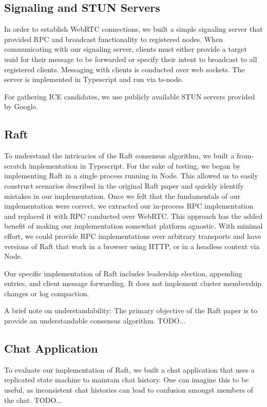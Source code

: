 \documentclass[11pt,twocolumn]{article}
\begin{document}
\subsection{Signaling and STUN Servers}
In order to establish WebRTC connections, we built a simple signaling server that provided RPC and broadcast functionality to registered nodes. When communicating with our signaling server, clients must either provide a target uuid for their message to be forwarded or specify their intent to broadcast to all registered clients. Messaging with clients is conducted over web sockets. The server is implemented in Typescript and run via ts-node.

For gathering ICE candidates, we use publicly available STUN servers provided by Google.

\subsection{Raft}
To understand the intricacies of the Raft consensus algorithm, we built a from-scratch implementation in Typescript. For the sake of testing, we began by implementing Raft in a single process running in Node. This allowed us to easily construct scenarios described in the original Raft paper and quickly identify mistakes in our implementation. Once we felt that the fundamentals of our implementation were correct, we extracted our in-process RPC implementation and replaced it with RPC conducted over WebRTC. This approach has the added benefit of making our implementation somewhat platform agnostic. With minimal effort, we could provide RPC implementations over arbitrary transports and have versions of Raft that work in a browser using HTTP, or in a headless context via Node.

Our specific implementation of Raft includes leadership election, appending entries, and client message forwarding. It does not implement cluster membership changes or log compaction.

A brief note on understandability: The primary objective of the Raft paper is to provide an understandable consensus algorithm. TODO...

\subsection{Chat Application}
To evaluate our implementation of Raft, we built a chat application that uses a replicated state machine to maintain chat history. One can imagine this to be useful, as inconsistent chat histories can lead to confusion amongst members of the chat. TODO...
\end{document}
